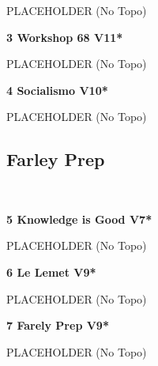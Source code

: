 \begin{multicols}{2}
\begin{minipage}{\linewidth}
					\begin{adjustwidth}{0.5cm}{}				
					PLACEHOLDER
						\newline (No Topo) 
					\end{adjustwidth}
					\end{minipage}
					\begin{minipage}{\linewidth}	
					\label{rt:Workshop 68}
\colorbox{red!20}{
\parbox{0.95\textwidth}{
\textbf{
3 Workshop 68 V11*  
}
}
}

					\begin{adjustwidth}{0.5cm}{}				
					PLACEHOLDER
						\newline (No Topo) 
					\end{adjustwidth}
					\end{minipage}
					\begin{minipage}{\linewidth}	
					\label{rt:Socialismo}
\colorbox{red!20}{
\parbox{0.95\textwidth}{
\textbf{
4 Socialismo V10*  
}
}
}

					\begin{adjustwidth}{0.5cm}{}				
					PLACEHOLDER
						\newline (No Topo) 
					\end{adjustwidth}
					\end{minipage}
			\begin{minipage}{\columnwidth}
			\subsection*{Farley Prep}\label{bf:Farley Prep}
			\
			
			\end{minipage}
			
					\begin{minipage}{\linewidth}	
					\label{rt:Knowledge is Good}
\colorbox{Goldenrod!50}{
\parbox{0.95\textwidth}{
\textbf{
5 Knowledge is Good V7*  
}
}
}

					\begin{adjustwidth}{0.5cm}{}				
					PLACEHOLDER
						\newline (No Topo) 
					\end{adjustwidth}
					\end{minipage}
					\begin{minipage}{\linewidth}	
					\label{rt:Le Lemet}
\colorbox{Goldenrod!50}{
\parbox{0.95\textwidth}{
\textbf{
6 Le Lemet V9*  
}
}
}

					\begin{adjustwidth}{0.5cm}{}				
					PLACEHOLDER
						\newline (No Topo) 
					\end{adjustwidth}
					\end{minipage}
					\begin{minipage}{\linewidth}	
					\label{rt:Farely Prep}
\colorbox{Goldenrod!50}{
\parbox{0.95\textwidth}{
\textbf{
7 Farely Prep V9*  
}
}
}

					\begin{adjustwidth}{0.5cm}{}				
					PLACEHOLDER
						\newline (No Topo) 
					\end{adjustwidth}
					\end{minipage}
\end{multicols}
\clearpage